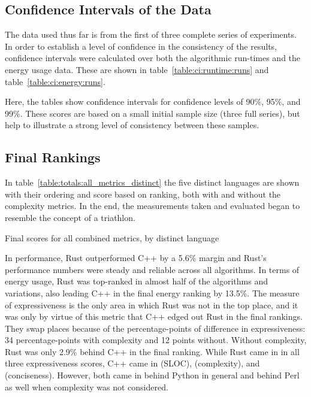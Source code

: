 \subsection{Confidence Intervals of the Data}
\label{subsec:confidence-intervals}

The data used thus far is from the first of three complete series of experiments. In order to establish a level of confidence in the consistency of the results, confidence intervals were calculated over both the algorithmic run-times and the energy usage data. These are shown in table~\ref{table:ci:runtime:runs} and table~\ref{table:ci:energy:runs}.





Here, the tables show confidence intervals for confidence levels of 90\%, 95\%, and 99\%. These scores are based on a small initial sample size (three full series), but help to illustrate a strong level of consistency between these samples.

\subsection{Final Rankings}
\label{subsec:final-rankings}

In table~\ref{table:totals:all_metrics_distinct} the five distinct languages are shown with their ordering and score based on ranking, both with and without the complexity metrics. In the end, the measurements taken and evaluated began to resemble the concept of a triathlon.

\begin{table}[!htb]

\caption{Final scores for all combined metrics, by distinct language}
\label{table:totals:all_metrics_distinct}
\end{table}

In performance, Rust outperformed C++ by a 5.6\% margin and Rust's performance numbers were steady and reliable across all algorithms. In terms of energy usage, Rust was top-ranked in almost half of the algorithms and variations, also leading C++ in the final energy ranking by 13.5\%. The measure of expressiveness is the only area in which Rust was not in the top place, and it was only by virtue of this metric that C++ edged out Rust in the final rankings. They swap places because of the percentage-points of difference in expressiveness: 34 percentage-points with complexity and 12 points without. Without complexity, Rust was only 2.9\% behind C++ in the final ranking. While Rust came in  in all three expressiveness scores, C++ came in  (SLOC),  (complexity), and  (conciseness). However, both came in behind Python in general and behind Perl as well when complexity was not considered.


